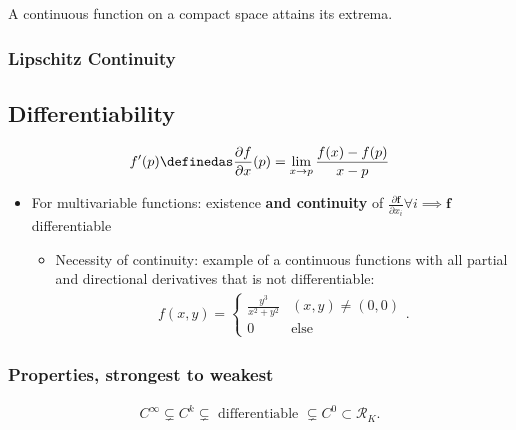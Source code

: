 \begin{theorem}

A continuous function on a compact space attains its extrema.

\end{theorem}

\hypertarget{lipschitz-continuity}{%
\subsubsection{Lipschitz Continuity}\label{lipschitz-continuity}}

\hypertarget{differentiability}{%
\subsection{Differentiability}\label{differentiability}}

\begin{align*}
f'(p) \definedas \frac{\partial f}{\partial x}(p) = \lim_{x\to p} \frac{f(x) - f(p)}{x-p}
\end{align*}

\begin{itemize}
\tightlist
\item
  For multivariable functions: existence \textbf{and continuity} of
  \(\frac{\partial \mathbf{f}}{\partial x_i} \forall i \implies \mathbf{f}\)
  differentiable

  \begin{itemize}
  \tightlist
  \item
    Necessity of continuity: example of a continuous functions with all
    partial and directional derivatives that is not differentiable:
    \begin{align*}  
    f(x, y) = 
    \begin{cases}
    \frac{y^3}{x^2+y^2} & (x,y) \neq (0,0) \\ 
    0 & \text{else}
    \end{cases}
    .\end{align*}
  \end{itemize}
\end{itemize}

\hypertarget{properties-strongest-to-weakest}{%
\subsubsection{Properties, strongest to
weakest}\label{properties-strongest-to-weakest}}

\begin{align*}  
C^\infty \subsetneq C^k \subsetneq \text{ differentiable } \subsetneq C^0 \subset \mathcal{R}_K
.\end{align*}

